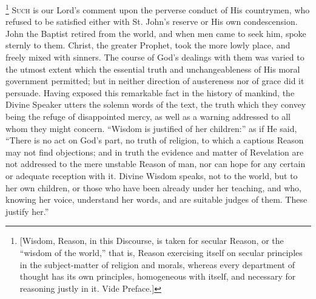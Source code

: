 \footnote{[Wisdom, Reason, in this Discourse, is taken for secular Reason,
or the ``wisdom of the world,'' that is, Reason exercising
itself on secular principles in the subject-matter of religion and
morals, whereas every department of thought has its own principles,
homogeneous with itself, and necessary for reasoning justly in it.
Vide Preface.]} S\textsc{uch} is our Lord's
comment upon the perverse conduct of His countrymen, who refused to be
satisfied either with St. John's reserve or His own condescension.
John the Baptist retired from the world, and when men came to seek
him, spoke sternly to them. Christ, the greater Prophet, took the more
lowly place, and freely mixed with sinners. The course of God's
dealings with them was varied to the utmost extent which the essential
truth and unchangeableness of His moral government permitted; but in
neither direction of austereness nor of grace did it persuade. Having
exposed this remarkable fact in the history of mankind, the Divine
Speaker utters the solemn words of the text, the truth which they
convey being the refuge of disappointed mercy, as well as a warning
addressed to all whom they might concern. ``Wisdom is justified of
her children:'' as if He said, ``There is no act on God's
part, no truth of religion, to which a captious Reason may not find
objections; and in truth the evidence and matter of Revelation are not
addressed to the mere unstable Reason of man, nor can hope for any
certain or adequate reception with it. Divine Wisdom speaks, not to
the world, but to her own children, or those who have been already
under her teaching, and who, knowing her voice, understand her words,
and are suitable judges of them. These justify her.''

